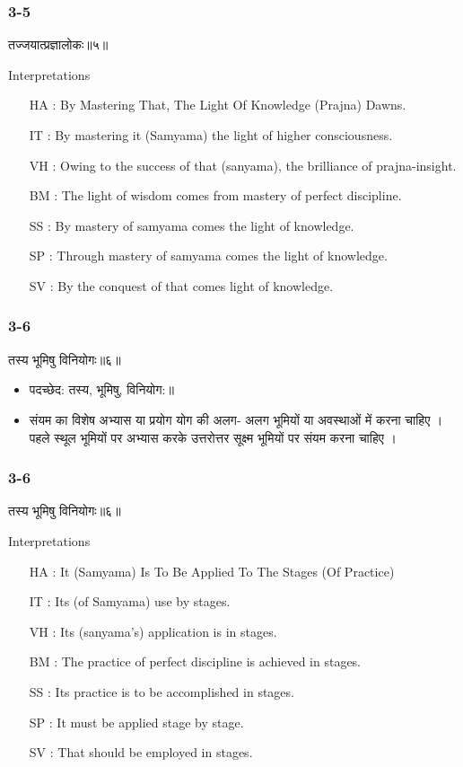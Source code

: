 \begin{frame}[fragile]\frametitle{3-5}
\begin{sanskrit}
तज्जयात्प्रज्ञालोकः॥५॥
\end{sanskrit}

Interpretations
\begin{itemize}	
\item [HA]: By Mastering That, The Light Of Knowledge (Prajna) Dawns.
\item [IT]: By mastering it (Samyama) the light of higher consciousness.
\item [VH]: Owing to the success of that (sanyama), the brilliance of prajna-insight.
\item [BM]: The light of wisdom comes from mastery of perfect discipline.
\item [SS]: By mastery of samyama comes the light of knowledge.
\item [SP]: Through mastery of samyama comes the light of knowledge.
\item [SV]: By the conquest of that comes light of knowledge. 
\end{itemize}
\end{frame}

\begin{frame}[fragile]\frametitle{3-6}
\begin{sanskrit}
तस्य भूमिषु विनियोगः॥६॥
\end{sanskrit}

\begin{itemize}
\item पदच्छेद: तस्य, भूमिषु, विनियोग:॥
\item संयम का विशेष अभ्यास या प्रयोग योग की अलग- अलग भूमियों या अवस्थाओं में करना चाहिए । पहले स्थूल भूमियों पर अभ्यास करके उत्तरोत्तर सूक्ष्म भूमियों पर संयम करना चाहिए ।
\end{itemize}
\end{frame}


\begin{frame}[fragile]\frametitle{3-6}
\begin{sanskrit}
तस्य भूमिषु विनियोगः॥६॥
\end{sanskrit}

Interpretations
\begin{itemize}	
\item [HA]: It (Samyama) Is To Be Applied To The Stages (Of Practice)
\item [IT]: Its (of Samyama) use by stages.
\item [VH]: Its (sanyama’s) application is in stages.
\item [BM]: The practice of perfect discipline is achieved in stages.
\item [SS]: Its practice is to be accomplished in stages.
\item [SP]: It must be applied stage by stage.
\item [SV]: That should be employed in stages. 
\end{itemize}
\end{frame}

